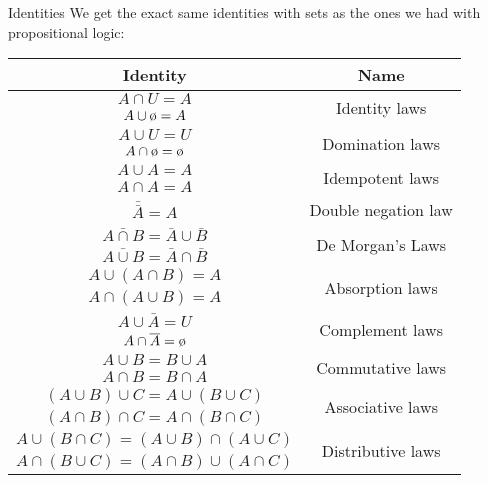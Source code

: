 \documentclass[a4paper]{article}
\begin{document}
\begin{parag}{Identities}
    We get the exact same identities with sets as the ones we had with propositional logic:
    \begin{center}
    \begin{tabular}{|c|c|}
        \hline
        \textbf{Identity} & \textbf{Name} \\
        \hline
        \hline
        $A \cap U = A$ & \multirow{2}{*}{Identity laws} \\
        $A \cup \o = A$ & \\
        \hline
        $A \cup U = U$ & \multirow{2}{*}{Domination laws} \\
        $A \cap \o = \o$ & \\
        \hline
        $A \cup A = A$ & \multirow{2}{*}{Idempotent laws} \\
        $A \cap A = A$ & \\
        \hline
        $\bar{\bar{A}} = A$ & Double negation law \\
        \hline
        $\bar{A \cap B} = \bar{A} \cup \bar{B}$ & \multirow{2}{*}{De Morgan's Laws} \\
        $\bar{A \cup B} = \bar{A} \cap \bar{B}$ & \\
        \hline
        \hline
        $A \cup \left(A \cap B\right) = A$ & \multirow{2}{*}{Absorption laws} \\
        $A \cap \left(A \cup B\right) = A$ & \\
        \hline
        $A \cup \bar{A} = U$ & \multirow{2}{*}{Complement laws} \\
        $A \cap \bar{A} = \o$ & \\
        \hline
        \hline
        $A \cup B = B \cup A$ & \multirow{2}{*}{Commutative laws} \\
        $A \cap B = B \cap A$ & \\
        \hline
        $\left(A \cup B\right) \cup C = A \cup \left(B \cup C\right)$ & \multirow{2}{*}{Associative laws} \\
        $\left(A \cap B\right) \cap C = A \cap \left(B \cap C\right)$ & \\
        \hline
        $A \cup \left(B \cap C\right) = \left(A \cup B\right) \cap \left(A \cup C\right)$ & \multirow{2}{*}{Distributive laws} \\
        $A \cap \left(B \cup C\right) = \left(A \cap B\right) \cup \left(A \cap C\right)$ & \\
        \hline
    \end{tabular}
    \end{center}
\end{parag}
\end{document}
